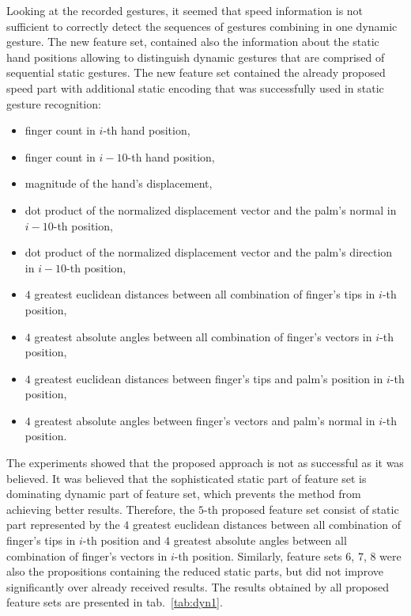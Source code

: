 Looking at the recorded gestures, it seemed that speed information is not sufficient to correctly detect the sequences of gestures combining in one dynamic gesture.
The new feature set, contained also the information about the static hand positions allowing to distinguish dynamic gestures that are comprised of sequential static gestures.
The new feature set contained the already proposed speed part with additional static encoding that was successfully used in static gesture recognition:
\begin{itemize}
\item finger count in $i$-th hand position,
\item finger count in $i-10$-th hand position,
\item magnitude of the hand's displacement,
\item dot product of the normalized displacement vector and the palm's normal in $i-10$-th position,
\item dot product of the normalized displacement vector and the palm's direction in $i-10$-th position,
\item $4$ greatest euclidean distances between all combination of finger's tips in $i$-th position,
\item $4$ greatest absolute angles between all combination of finger's vectors in $i$-th position,
\item $4$ greatest euclidean distances between finger's tips and palm's position in $i$-th position,
\item $4$ greatest absolute angles between finger's vectors and palm's normal in $i$-th position.
\end{itemize}

The experiments showed that the proposed approach is not as successful as it was believed.
It was believed that the sophisticated static part of feature set is dominating dynamic part of feature set, which prevents the method from achieving better results.
Therefore, the $5$-th proposed feature set consist of static part represented by the $4$ greatest euclidean distances between all combination of finger's tips in $i$-th position and $4$ greatest absolute angles between all combination of finger's vectors in $i$-th position.
Similarly, feature sets $6$, $7$, $8$ were also the propositions containing the reduced static parts, but did not improve significantly over already received results. 
The results obtained by all proposed feature sets are presented in tab.~\ref{tab:dyn1}. 

